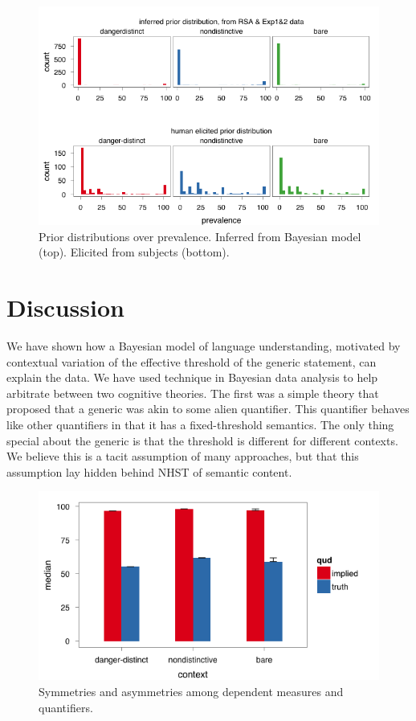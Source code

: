 \documentclass[10pt,letterpaper]{article}
\begin{document}
\begin{figure}
\centering
    \includegraphics[width=\columnwidth]{exp3hist_inferredMeanPriorExp1_2}
    \caption{Prior distributions over prevalence. Inferred from Bayesian model (top). Elicited from subjects (bottom).}
  \label{fig:modeldatapriors}
\end{figure}






\section{Discussion}

We have shown how a Bayesian model of language understanding, motivated by contextual variation of the effective threshold of the generic statement, can explain the data. We have used technique in Bayesian data analysis to help arbitrate between two cognitive theories. The first was a simple theory that proposed that a generic was akin to some alien quantifier. This quantifier behaves like other quantifiers in that it has a fixed-threshold semantics. The only thing special about the generic is that the threshold is different for different contexts. We believe this is a tacit assumption of many approaches, but that this assumption lay hidden behind NHST of semantic content.

\begin{figure}
\centering
    \includegraphics[width=\columnwidth]{asymmetry_byContext_condTwice}
    \caption{Symmetries and asymmetries among dependent measures and quantifiers.}
  \label{fig:asymmetry}
\end{figure}
\end{document}
